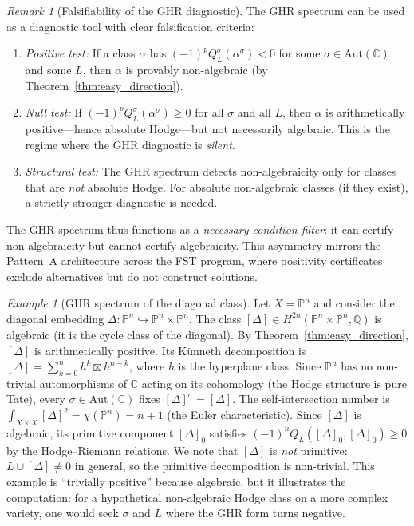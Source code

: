 \documentclass[aps,prd,twocolumn,superscriptaddress,nofootinbib]{revtex4-2}
\theoremstyle{definition}
\theoremstyle{remark}
\newtheorem{remark}[theorem]{Remark}
\newtheorem{example}[theorem]{Example}
\begin{document}
\begin{remark}[Falsifiability of the GHR diagnostic]
\label{rem:ghr-falsifiability}
The GHR spectrum can be used as a diagnostic tool with clear falsification criteria:
\begin{enumerate}
\item \emph{Positive test:} If a class $\alpha$ has $(-1)^p Q_L^\sigma(\alpha^\sigma) < 0$ for some $\sigma \in \mathrm{Aut}(\mathbb{C})$ and some $L$, then $\alpha$ is provably non-algebraic (by Theorem~\ref{thm:easy_direction}).
\item \emph{Null test:} If $(-1)^p Q_L^\sigma(\alpha^\sigma) \geq 0$ for all $\sigma$ and all $L$, then $\alpha$ is arithmetically positive---hence absolute Hodge---but not necessarily algebraic. This is the regime where the GHR diagnostic is \emph{silent}.
\item \emph{Structural test:} The GHR spectrum detects non-algebraicity only for classes that are \emph{not} absolute Hodge. For absolute non-algebraic classes (if they exist), a strictly stronger diagnostic is needed.
\end{enumerate}
The GHR spectrum thus functions as a \emph{necessary condition filter}: it can certify non-algebraicity but cannot certify algebraicity. This asymmetry mirrors the Pattern~A architecture across the FST program, where positivity certificates exclude alternatives but do not construct solutions.
\end{remark}

\begin{example}[GHR spectrum of the diagonal class]
\label{ex:diagonal}
Let $X = \mathbb{P}^n$ and consider the diagonal embedding $\Delta: \mathbb{P}^n \hookrightarrow \mathbb{P}^n \times \mathbb{P}^n$. The class $[\Delta] \in H^{2n}(\mathbb{P}^n \times \mathbb{P}^n, \mathbb{Q})$ is algebraic (it is the cycle class of the diagonal). By Theorem~\ref{thm:easy_direction}, $[\Delta]$ is arithmetically positive. Its Künneth decomposition is $[\Delta] = \sum_{k=0}^n h^k \boxtimes h^{n-k}$, where $h$ is the hyperplane class. Since $\mathbb{P}^n$ has no non-trivial automorphisms of $\mathbb{C}$ acting on its cohomology (the Hodge structure is pure Tate), every $\sigma \in \mathrm{Aut}(\mathbb{C})$ fixes $[\Delta]^\sigma = [\Delta]$. The self-intersection number is $\int_{X \times X} [\Delta]^2 = \chi(\mathbb{P}^n) = n + 1$ (the Euler characteristic). Since $[\Delta]$ is algebraic, its primitive component $[\Delta]_0$ satisfies $(-1)^n Q_L([\Delta]_0, [\Delta]_0) \geq 0$ by the Hodge--Riemann relations. We note that $[\Delta]$ is \emph{not} primitive: $L \cup [\Delta] \neq 0$ in general, so the primitive decomposition is non-trivial. This example is ``trivially positive'' because algebraic, but it illustrates the computation: for a hypothetical non-algebraic Hodge class on a more complex variety, one would seek $\sigma$ and $L$ where the GHR form turns negative.
\end{example}
\end{document}
